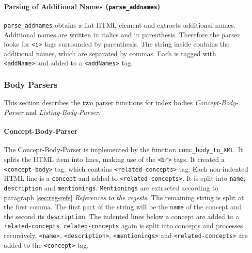 \paragraph{Parsing of Additional Names \texttt{(parse\_addnames)}}
\label{sec:addNames}
\texttt{parse\_addnames} obtains a flat HTML element and extracts
additional names. Additional names are written in italics and in
parenthesis. Therefore the parser looks for \texttt{<i>} tags
surrounded by parenthesis. The string inside contains the additional
names, which are separated by commas. Each is tagged with
\texttt{<addName>} and added to a \texttt{<addNames>} tag.


\subsubsection{Body Parsers}
This section describes the two parser functions for index bodies
\textit{Concept-Body-Parser} and \textit{Listing-Body-Parser}.

\paragraph{Concept-Body-Parser}
\label{sec:conc-body-parser}
The Concept-Body-Parser is implemented by the function
\texttt{conc\_body\_to\_XML}. It splits the HTML item into lines,
making use of the \texttt{<br>} tags. It created a
\texttt{<concept-body>} tag, which contains
\texttt{<related-concepts>} tag. Each non-indented HTML line is a
\texttt{concept} and added to \texttt{<related-concepts>}. It is split
into \texttt{name}, \texttt{description} and \texttt{mentionings}.
\texttt{Mentionings} are extracted according to paragraph
\ref{sec:reg-refs} \textit{References to the regests}. The remaining
string is split at the first comma. The first part of the string will
be the \texttt{name} of the concept and the second its
\texttt{description}. The indented lines below a concept are added to
a \texttt{related-concepts}. \texttt{related-concepts} again is split
into concepts and processes recursively. \texttt{<name>},
\texttt{<description>}, \texttt{<mentionings>} and
\texttt{<related-concepts>} are added to the \texttt{<concept>} tag.

